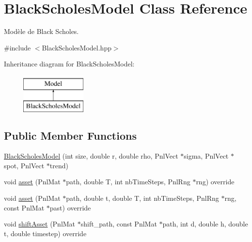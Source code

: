 \hypertarget{classBlackScholesModel}{\section{Black\-Scholes\-Model Class Reference}
\label{classBlackScholesModel}
}


Modèle de Black Scholes.  




{\ttfamily \#include $<$Black\-Scholes\-Model.\-hpp$>$}

Inheritance diagram for Black\-Scholes\-Model\-:\begin{figure}[H]
\begin{center}
\leavevmode
\includegraphics[height=2.000000cm]{classBlackScholesModel}
\end{center}
\end{figure}
\subsection*{Public Member Functions}
\begin{DoxyCompactItemize}
\item 
\hyperlink{classBlackScholesModel_a803b1ad2cd281d16f0ac66145dbdc9f3}{Black\-Scholes\-Model} (int size, double r, double rho, Pnl\-Vect $\ast$sigma, Pnl\-Vect $\ast$spot, Pnl\-Vect $\ast$trend)
\item 
void \hyperlink{classBlackScholesModel_a5c35ad270631947ce5d76f43bc62b544}{asset} (Pnl\-Mat $\ast$path, double T, int nb\-Time\-Steps, Pnl\-Rng $\ast$rng) override
\item 
void \hyperlink{classBlackScholesModel_a140472ccf827b6244a56a0a34e2def57}{asset} (Pnl\-Mat $\ast$path, double t, double T, int nb\-Time\-Steps, Pnl\-Rng $\ast$rng, const Pnl\-Mat $\ast$past) override
\item 
void \hyperlink{classBlackScholesModel_a3ea2cb722b330f1d52677dc229630c75}{shift\-Asset} (Pnl\-Mat $\ast$shift\-\_\-path, const Pnl\-Mat $\ast$path, int d, double h, double t, double timestep) override
\end{DoxyCompactItemize}
